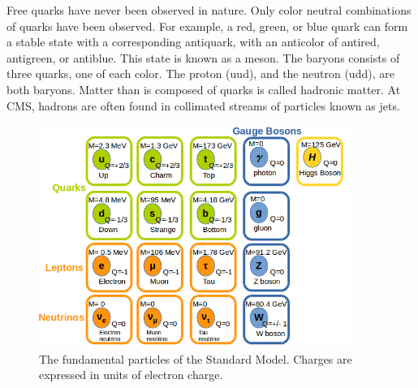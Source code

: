 \documentclass[oneside, letterpaper, oldfontcommands]{memoir}
\begin{document}
\qquad Free quarks have never been observed in nature. Only color neutral combinations of quarks have been observed. For example, a red, green, or blue quark can form a stable state with a corresponding antiquark, with an anticolor of antired, antigreen, or antiblue. This state is known as a meson. The baryons consists of three quarks, one of each color. The proton (uud), and the neutron (udd), are both baryons. Matter than is composed of quarks is called hadronic matter. At CMS, hadrons are often found in collimated streams of particles known as jets. 

\begin{figure}[here]
\includegraphics[width=0.9\textwidth]{StandardModel.png}
\caption{The fundamental particles of the Standard Model. Charges are expressed in units of electron charge.\cite{Agashe:2014kda} }
\label{fig:SMParticles}
\end{figure}


\end{document}
